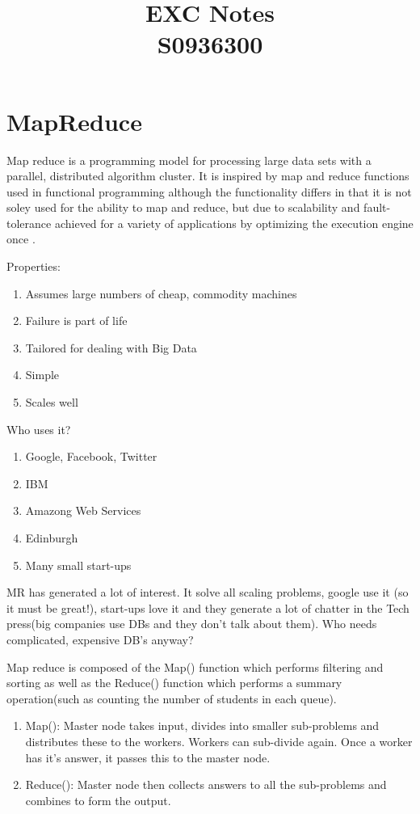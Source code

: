 \documentclass[11pt]{article}
\begin{document}
\title{EXC Notes \\ S0936300}
\maketitle

\section{MapReduce}

Map reduce is a programming model for processing large data sets with a parallel, distributed algorithm cluster. It is inspired by map and reduce functions used in functional programming although the functionality differs in that it is not soley used for the ability to map and reduce, but due to scalability and fault-tolerance achieved for a variety of applications by optimizing the execution engine once \cite{wiki}\cite{condense}.

Properties:
\begin{enumerate}
\item Assumes large numbers of cheap, commodity machines
\item Failure is part of life
\item Tailored for dealing with Big Data
\item Simple
\item Scales well
\end{enumerate}

Who uses it?

\begin{enumerate}
\item Google, Facebook, Twitter
\item IBM
\item Amazong Web Services
\item Edinburgh
\item Many small start-ups
\end{enumerate}

MR has generated a lot of interest. It solve all scaling problems, google use it (so it must be great!), start-ups love it and they generate a lot of chatter in the Tech press(big companies use DBs and they don't talk about them). Who needs complicated, expensive DB's anyway?

Map reduce is composed of the Map() function which performs filtering and sorting as well as the Reduce() function which performs a summary operation(such as counting the number of students in each queue).

\begin{enumerate}
\item Map(): Master node takes input, divides into smaller sub-problems and distributes these to the workers. Workers can sub-divide again. Once a worker has it's answer, it passes this to the master node.
\item Reduce(): Master node then collects answers to all the sub-problems and combines to form the output.
\end{enumerate}
\end{document}
